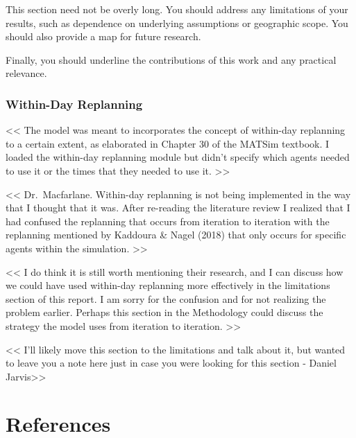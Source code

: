 \documentclass[fancy, oneside, mastersfancy, ms]{byuthesis}
\begin{document}
This section need not be overly long. You should address any limitations
of your results, such as dependence on underlying assumptions or
geographic scope. You should also provide a map for future research.

Finally, you should underline the contributions of this work and any
practical relevance.

\hypertarget{within-day-replanning}{%
\subsection{Within-Day Replanning}\label{within-day-replanning}}

\textless\textless{} The model was meant to incorporates the concept of
within-day replanning to a certain extent, as elaborated in Chapter 30
of the MATSim textbook. I loaded the within-day replanning module but
didn't specify which agents needed to use it or the times that they
needed to use it. \textgreater\textgreater{}

\textless\textless{} Dr.~Macfarlane. Within-day replanning is not being
implemented in the way that I thought that it was. After re-reading the
literature review I realized that I had confused the replanning that
occurs from iteration to iteration with the replanning mentioned by
Kaddoura \& Nagel (2018) that only occurs for specific agents within the
simulation. \textgreater\textgreater{}

\textless\textless{} I do think it is still worth mentioning their
research, and I can discuss how we could have used within-day replanning
more effectively in the limitations section of this report. I am sorry
for the confusion and for not realizing the problem earlier. Perhaps
this section in the Methodology could discuss the strategy the model
uses from iteration to iteration. \textgreater\textgreater{}

\textless\textless{} I'll likely move this section to the limitations
and talk about it, but wanted to leave you a note here just in case you
were looking for this section - Daniel Jarvis\textgreater\textgreater{}


\hypertarget{references}{%
\chapter*{References}\label{references}}

\end{document}
